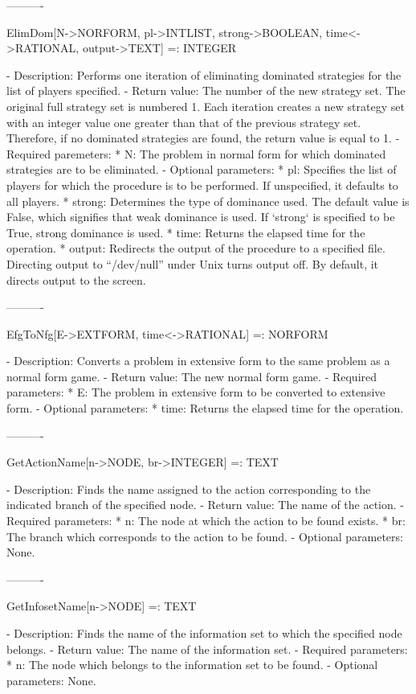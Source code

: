 ----------

ElimDom[N->NORFORM, {pl->INTLIST}, {strong->BOOLEAN}, {time<->RATIONAL},
	{output->TEXT}] =: INTEGER

   -	Description:  Performs one iteration of eliminating dominated 
	strategies for the list of players specified.  
   -	Return value:  The number of the new strategy set.  The original full
	strategy set is numbered 1.  Each iteration creates a new strategy set
	with an integer value one greater than that of the previous strategy 
	set.  Therefore, if no dominated strategies are found, the return value
	is equal to 1.
   -	Required paremeters:
	  *  N:  The problem in normal form for which dominated strategies are
	     to be eliminated.
   -	Optional parameters:
	  *  pl:  Specifies the list of players for which the procedure is to
	     be performed.  If unspecified, it defaults to all players. 
 	  *  strong:  Determines the type of dominance used.  The default value
	     is False, which signifies that weak dominance is used.  If 
	     `strong` is specified to be True, strong dominance is used.  
	  *  time:  Returns the elapsed time for the operation.
	  *  output:  Redirects the output of the procedure to a specified 
	     file.  Directing output to ``/dev/null'' under Unix turns output
	     off.  By default, it directs output to the screen.

----------

EfgToNfg[E->EXTFORM, {time<->RATIONAL}] =: NORFORM

   -	Description:  Converts a problem in extensive form to the same problem
	as a normal form game.
   -	Return value:  The new normal form game.  
   -	Required parameters:
	  *  E:  The problem in extensive form to be converted to extensive 
	     form.
   -	Optional parameters:
	  *  time:  Returns the elapsed time for the operation.

----------

GetActionName[n->NODE, br->INTEGER] =: TEXT

   -	Description:  Finds the name assigned to the action corresponding to 
	the indicated branch of the specified node.
   -	Return value:  The name of the action.
   -	Required parameters:
	  *  n:  The node at which the action to be found exists.
	  *  br:  The branch which corresponds to the action to be found.
   -	Optional parameters:  None.

----------

GetInfosetName[n->NODE] =: TEXT

   -	Description:  Finds the name of the information set to which the 
	specified node belongs.
   -	Return value:  The name of the information set.
   -	Required parameters:
	  *  n:  The node which belongs to the information set to be found.
   -	Optional parameters:  None.

